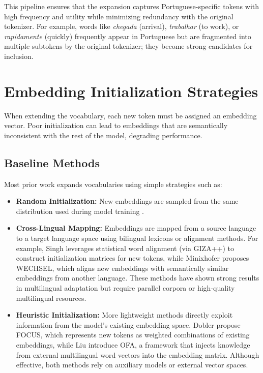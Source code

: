 This pipeline ensures that the expansion captures Portuguese-specific tokens with high frequency and utility while minimizing redundancy with the original tokenizer. For example, words like \textit{chegada} (arrival), \textit{trabalhar} (to work), or \textit{rapidamente} (quickly) frequently appear in Portuguese but are fragmented into multiple subtokens by the original tokenizer; they become strong candidates for inclusion.


\section{Embedding Initialization Strategies}
\label{sec:embedding_init}

When extending the vocabulary, each new token must be assigned an embedding vector. Poor initialization can lead to embeddings that are semantically inconsistent with the rest of the model, degrading performance.

\subsection{Baseline Methods}
Most prior work expands vocabularies using simple strategies such as:
\begin{itemize}
    \item \textbf{Random Initialization:} New embeddings are sampled from the same distribution used during model training \cite{kocmi2017embed}.
    \item \textbf{Cross-Lingual Mapping:} Embeddings are mapped from a source language to a target language space using bilingual lexicons or alignment methods. For example, Singh \cite{singh2025tokeninit} leverages statistical word alignment (via GIZA++) to construct initialization matrices for new tokens, while Minixhofer \cite{minixhofer2022subwembedinit} proposes WECHSEL, which aligns new embeddings with semantically similar embeddings from another language. These methods have shown strong results in multilingual adaptation but require parallel corpora or high-quality multilingual resources.
    \item \textbf{Heuristic Initialization:} More lightweight methods directly exploit information from the model's existing embedding space. Dobler \cite{dobler2023embedinit} propose FOCUS, which represents new tokens as weighted combinations of existing embeddings, while Liu \cite{liu2024embedinit} introduce OFA, a framework that injects knowledge from external multilingual word vectors into the embedding matrix. Although effective, both methods rely on auxiliary models or external vector spaces.
\end{itemize}


